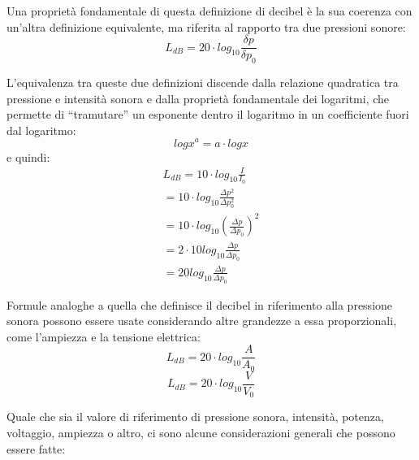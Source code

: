 \documentclass[11pt]{report}
\begin{document}
Una proprietà fondamentale di questa definizione di decibel è la sua coerenza con un'altra definizione equivalente, ma riferita al rapporto tra due pressioni sonore:
\begin{equation}
L_{dB} = 20 \cdot log_{10}\frac{\delta p}{\delta p_0}
\end{equation}

L'equivalenza tra queste due definizioni discende dalla relazione quadratica tra pressione e intensità sonora e dalla proprietà fondamentale dei logaritmi, che permette di ``tramutare'' un esponente dentro il logaritmo in un coefficiente fuori dal logaritmo:
\begin{equation}
log x^a = a \cdot log x
\end{equation}
e quindi:
\begin{equation}
\begin{aligned}
L_{dB} = 10 \cdot log_{10}\frac{I}{I_0}\\
= 10 \cdot log_{10}\frac{\Delta p^2}{\Delta p_0^2}\\
= 10 \cdot log_{10}(\frac{\Delta p}{\Delta p_0})^2\\
= 2 \cdot 10 log_{10}\frac{\Delta p}{\Delta p_0}\\
= 20 log_{10}\frac{\Delta p}{\Delta p_0}
\end{aligned}
\end{equation}

Formule analoghe a quella che definisce il decibel in riferimento alla pressione sonora possono essere usate considerando altre grandezze a essa proporzionali, come l'ampiezza e la tensione elettrica:
\begin{equation}
L_{dB} = 20 \cdot log_{10}\frac{A}{A_0}
\end{equation}
\begin{equation}
L_{dB} = 20 \cdot log_{10}\frac{V}{V_0}
\end{equation}

Quale che sia il valore di riferimento di pressione sonora, intensità, potenza, voltaggio, ampiezza o altro, ci sono alcune considerazioni generali che possono essere fatte:
\end{document}
